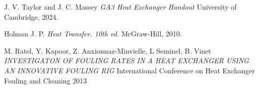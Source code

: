 \documentclass{article}
\begin{document}
\begin{thebibliography}{9}

    
      J. V. Taylor and J. C. Massey
      \emph{GA3 Heat Exchanger Handout}
      University of Cambridge,
      2024.
    
      Holman J. P.
      \emph{Heat Transfer. 10th ed.}
      McGraw-Hill,
      2010.

      M. Ratel, Y. Kapoor, Z. Anxionnaz-Minvielle, L Seminel, B. Vinet
      \emph{INVESTIGATON OF FOULING RATES IN A HEAT EXCHANGER USING AN INNOVATIVE FOULING RIG}
      International Conference on Heat Exchanger Fouling and Cleaning
      2013

\end{thebibliography}
\end{document}
